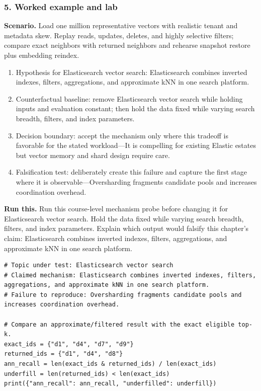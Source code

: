 \subsubsection*{5. Worked example and lab}
\textbf{Scenario.} Load one million representative vectors with realistic tenant and metadata skew. Replay reads, updates, deletes, and highly selective filters; compare exact neighbors with returned neighbors and rehearse snapshot restore plus embedding reindex.
\begin{enumerate}
\item Hypothesis for Elasticsearch vector search: Elasticsearch combines inverted indexes, filters, aggregations, and approximate kNN in one search platform.
\item Counterfactual baseline: remove Elasticsearch vector search while holding inputs and evaluation constant; then hold the data fixed while varying search breadth, filters, and index parameters.
\item Decision boundary: accept the mechanism only where this tradeoff is favorable for the stated workload—It is compelling for existing Elastic estates but vector memory and shard design require care.
\item Falsification test: deliberately create this failure and capture the first stage where it is observable—Oversharding fragments candidate pools and increases coordination overhead.
\end{enumerate}
\textbf{Run this.} Run this course-level mechanism probe before changing it for Elasticsearch vector search. Hold the data fixed while varying search breadth, filters, and index parameters. Explain which output would falsify this chapter's claim: Elasticsearch combines inverted indexes, filters, aggregations, and approximate kNN in one search platform.
\begin{Verbatim}[fontsize=\scriptsize]
# Topic under test: Elasticsearch vector search
# Claimed mechanism: Elasticsearch combines inverted indexes, filters, aggregations, and approximate kNN in one search platform.
# Failure to reproduce: Oversharding fragments candidate pools and increases coordination overhead.

# Compare an approximate/filtered result with the exact eligible top-k.
exact_ids = {"d1", "d4", "d7", "d9"}
returned_ids = {"d1", "d4", "d8"}
ann_recall = len(exact_ids & returned_ids) / len(exact_ids)
underfill = len(returned_ids) < len(exact_ids)
print({"ann_recall": ann_recall, "underfilled": underfill})
\end{Verbatim}
